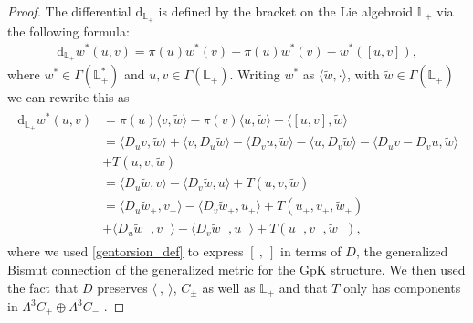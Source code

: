 \documentclass[letterpaper,12pt]{article}
\newcommand{\rd}{\mathrm{d}}
\newcommand{\Lb}{\mathbb{L}}
\newcommand{\se}{\Gamma}
\newcommand{\la}{\langle}
\newcommand{\ra}{\rangle}
\newcommand{\lara}{\la\ ,\ \ra}
\newcommand{\brac}{[\ ,\ ]}
\def\tl{\tilde}
\theoremstyle{definition}
\theoremstyle{remark}
\theoremstyle{examples}
\begin{document}
\begin{proof}
The differential $\rd_{\Lb_+}$ is defined by the bracket on the Lie algebroid $\Lb_+$ via the following formula:
\begin{align}\label{eq:proof_Liethm}
\rd_{\Lb_+}  w^* (u,v)=\pi(u) w^*(v)-\pi(u) w^*(v)- w^*([u,v]),
\end{align}
where $ w^* \in \se(\Lb_+^*)$ and $u,v\in \se(\Lb_+)$. Writing $ w^*$ as $\la \tl{w},\cdot\ra$, with $\tl{w}\in\se (\tl{\Lb}_+)$ we can rewrite this as
\begin{align}\label{dL}
\begin{aligned}
\rd_{\Lb_+}  w^* (u,v)&=\pi(u)\la v ,\tl{w}\ra-\pi(v)\la u,\tl{w}\ra-\la [u,v],\tl{w}\ra\\
&=\la D_uv,\tl{w}\ra+\la v,D_u \tl{w}\ra-\la D_v u,\tl{w}\ra-\la u,D_v\tl{w}\ra-\la D_uv-D_vu,\tl{w}\ra\\
&+{T}(u,v,\tl{w})\\
&=\la D_u \tl{w},v\ra-\la D_v\tl{w},u\ra+{T}(u,v,\tl{w})\\
&=\la D_u \tl{w}_+,v_+\ra-\la D_v\tl{w}_+,u_+\ra+{T}(u_+,v_+,\tl{w}_+)\\
&+\la D_u \tl{w}_-,v_-\ra-\la D_v\tl{w}_-,u_-\ra+{T}(u_-,v_-,\tl{w}_-),
\end{aligned}
\end{align}
where we used \eqref{gentorsion_def} to express $\brac$ in terms of $D$, the generalized Bismut connection of the generalized metric for the GpK structure. We then used the fact that $D$ preserves $\lara$, $C_\pm$ as well as $\Lb_+$ and that $T$ only has components in $\Lambda^3 C_+\oplus\Lambda^3 C_-$ \cite{Gualtieri:2010fd}.


\end{proof}
\end{document}
